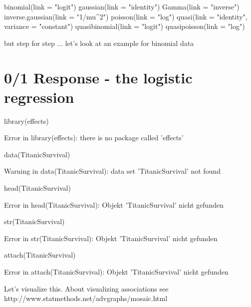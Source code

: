 \documentclass[a4paper,twoside]{tufte-book}\usepackage[]{graphicx}\usepackage[]{color}
\begin{document}
\begin{appendices}
\begin{Schunk}
\begin{Sinput}
binomial(link = "logit")
gaussian(link = "identity")
Gamma(link = "inverse")
inverse.gaussian(link = "1/mu^2")
poisson(link = "log")
quasi(link = "identity", variance = "constant")
quasibinomial(link = "logit")
quasipoisson(link = "log")
\end{Sinput}
\end{Schunk}

but step for step ... let's look at an example for binomial data


\section{0/1 Response - the logistic regression}

\begin{Schunk}
\begin{Sinput}
library(effects) 
\end{Sinput}
\begin{Soutput}
Error in library(effects): there is no package called 'effects'
\end{Soutput}
\begin{Sinput}
data(TitanicSurvival)
\end{Sinput}
\begin{Soutput}
Warning in data(TitanicSurvival): data set 'TitanicSurvival' not found
\end{Soutput}
\begin{Sinput}
head(TitanicSurvival)
\end{Sinput}
\begin{Soutput}
Error in head(TitanicSurvival): Objekt 'TitanicSurvival' nicht gefunden
\end{Soutput}
\begin{Sinput}
str(TitanicSurvival)
\end{Sinput}
\begin{Soutput}
Error in str(TitanicSurvival): Objekt 'TitanicSurvival' nicht gefunden
\end{Soutput}
\begin{Sinput}
attach(TitanicSurvival)
\end{Sinput}
\begin{Soutput}
Error in attach(TitanicSurvival): Objekt 'TitanicSurvival' nicht gefunden
\end{Soutput}
\end{Schunk}

Let's visualize this. About visualizing associations see http://www.statmethods.net/advgraphs/mosaic.html


\end{appendices}
\end{document}
